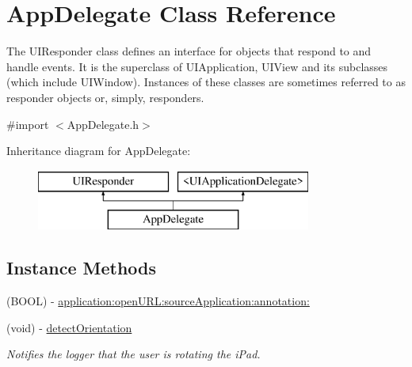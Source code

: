 \hypertarget{interface_app_delegate}{\section{App\-Delegate Class Reference}
\label{interface_app_delegate}
}


The U\-I\-Responder class defines an interface for objects that respond to and handle events. It is the superclass of U\-I\-Application, U\-I\-View and its subclasses (which include U\-I\-Window). Instances of these classes are sometimes referred to as responder objects or, simply, responders.  




{\ttfamily \#import $<$App\-Delegate.\-h$>$}

Inheritance diagram for App\-Delegate\-:\begin{figure}[H]
\begin{center}
\leavevmode
\includegraphics[height=2.000000cm]{interface_app_delegate}
\end{center}
\end{figure}
\subsection*{Instance Methods}
\begin{DoxyCompactItemize}
\item 
(B\-O\-O\-L) -\/ \hyperlink{interface_app_delegate_a8cf55cdca24f5077db73eab11a17dedf}{application\-:open\-U\-R\-L\-:source\-Application\-:annotation\-:}
\item 
\hypertarget{interface_app_delegate_a2fe81b234fcf8951be6ebc785d4f1a42}{(void) -\/ \hyperlink{interface_app_delegate_a2fe81b234fcf8951be6ebc785d4f1a42}{detect\-Orientation}}\label{interface_app_delegate_a2fe81b234fcf8951be6ebc785d4f1a42}

\begin{DoxyCompactList}\small\item\em Notifies the logger that the user is rotating the i\-Pad. \end{DoxyCompactList}\end{DoxyCompactItemize}
